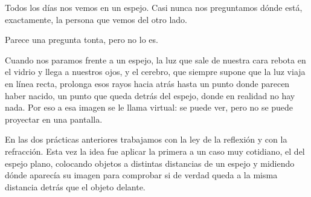 Todos los días nos vemos en un espejo. Casi nunca nos preguntamos dónde está, exactamente, la persona que vemos del otro lado.

Parece una pregunta tonta, pero no lo es.

Cuando nos paramos frente a un espejo, la luz que sale de nuestra cara rebota en el vidrio y llega a nuestros ojos, y el cerebro, que siempre supone que la luz viaja en línea recta, prolonga esos rayos hacia atrás hasta un punto donde parecen haber nacido, un punto que queda detrás del espejo, donde en realidad no hay nada. Por eso a esa imagen se le llama virtual: se puede ver, pero no se puede proyectar en una pantalla.

En las dos prácticas anteriores trabajamos con la ley de la reflexión y con la refracción. Esta vez la idea fue aplicar la primera a un caso muy cotidiano, el del espejo plano, colocando objetos a distintas distancias de un espejo y midiendo dónde aparecía su imagen para comprobar si de verdad queda a la misma distancia detrás que el objeto delante.
